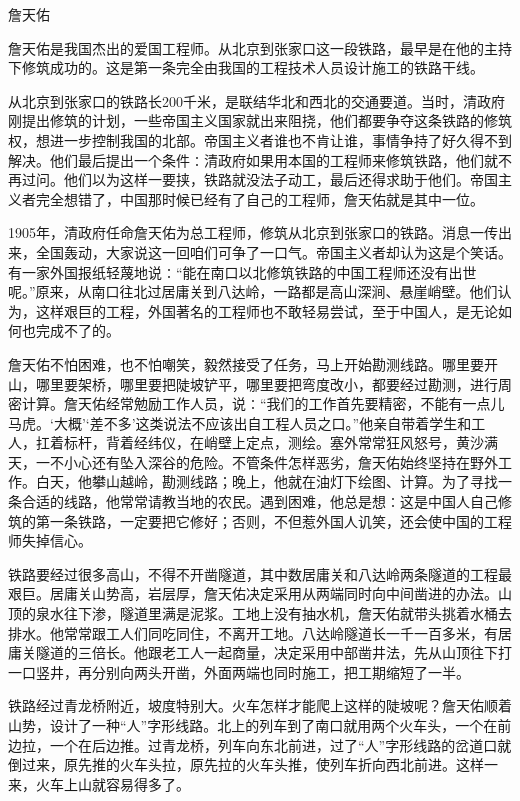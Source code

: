 \documentclass[12pt,UTF8]{ctexbook}
\begin{document}
詹天佑

詹天佑是我国杰出的爱国工程师。从北京到张家口这一段铁路，最早是在他的主持下修筑成功的。这是第一条完全由我国的工程技术人员设计施工的铁路干线。

从北京到张家口的铁路长200千米，是联结华北和西北的交通要道。当时，清政府刚提出修筑的计划，一些帝国主义国家就出来阻挠，他们都要争夺这条铁路的修筑权，想进一步控制我国的北部。帝国主义者谁也不肯让谁，事情争持了好久得不到解决。他们最后提出一个条件∶清政府如果用本国的工程师来修筑铁路，他们就不再过问。他们以为这样一要挟，铁路就没法子动工，最后还得求助于他们。帝国主义者完全想错了，中国那时候已经有了自己的工程师，詹天佑就是其中一位。

1905年，清政府任命詹天佑为总工程师，修筑从北京到张家口的铁路。消息一传出来，全国轰动，大家说这一回咱们可争了一口气。帝国主义者却认为这是个笑话。有一家外国报纸轻蔑地说∶“能在南口以北修筑铁路的中国工程师还没有出世呢。”原来，从南口往北过居庸关到八达岭，一路都是高山深涧、悬崖峭壁。他们认为，这样艰巨的工程，外国著名的工程师也不敢轻易尝试，至于中国人，是无论如何也完成不了的。

詹天佑不怕困难，也不怕嘲笑，毅然接受了任务，马上开始勘测线路。哪里要开山，哪里要架桥，哪里要把陡坡铲平，哪里要把弯度改小，都要经过勘测，进行周密计算。詹天佑经常勉励工作人员，说∶“我们的工作首先要精密，不能有一点儿马虎。‘大概’‘差不多’这类说法不应该出自工程人员之口。”他亲自带着学生和工人，扛着标杆，背着经纬仪，在峭壁上定点，测绘。塞外常常狂风怒号，黄沙满天，一不小心还有坠入深谷的危险。不管条件怎样恶劣，詹天佑始终坚持在野外工作。白天，他攀山越岭，勘测线路；晚上，他就在油灯下绘图、计算。为了寻找一条合适的线路，他常常请教当地的农民。遇到困难，他总是想∶这是中国人自己修筑的第一条铁路，一定要把它修好；否则，不但惹外国人讥笑，还会使中国的工程师失掉信心。

铁路要经过很多高山，不得不开凿隧道，其中数居庸关和八达岭两条隧道的工程最艰巨。居庸关山势高，岩层厚，詹天佑决定采用从两端同时向中间凿进的办法。山顶的泉水往下渗，隧道里满是泥浆。工地上没有抽水机，詹天佑就带头挑着水桶去排水。他常常跟工人们同吃同住，不离开工地。八达岭隧道长一千一百多米，有居庸关隧道的三倍长。他跟老工人一起商量，决定采用中部凿井法，先从山顶往下打一口竖井，再分别向两头开凿，外面两端也同时施工，把工期缩短了一半。

铁路经过青龙桥附近，坡度特别大。火车怎样才能爬上这样的陡坡呢？詹天佑顺着山势，设计了一种“人”字形线路。北上的列车到了南口就用两个火车头，一个在前边拉，一个在后边推。过青龙桥，列车向东北前进，过了“人”字形线路的岔道口就倒过来，原先推的火车头拉，原先拉的火车头推，使列车折向西北前进。这样一来，火车上山就容易得多了。
\end{document}
